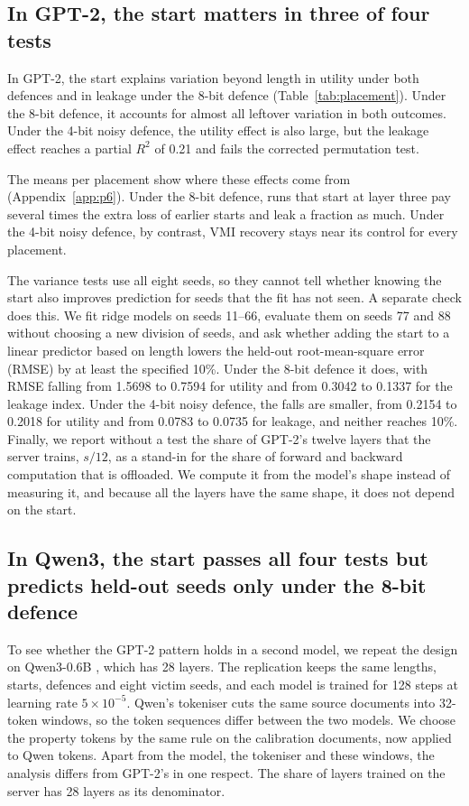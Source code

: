 \documentclass[11pt]{article}
\begin{document}
\subsection{In GPT-2, the start matters in three of four tests}
In GPT-2, the start explains variation beyond length in utility under both defences and in leakage under the 8-bit defence (Table~\ref{tab:placement}). Under the 8-bit defence, it accounts for almost all leftover variation in both outcomes. Under the 4-bit noisy defence, the utility effect is also large, but the leakage effect reaches a partial $R^2$ of 0.21 and fails the corrected permutation test.

The means per placement show where these effects come from (Appendix~\ref{app:p6}). Under the 8-bit defence, runs that start at layer three pay several times the extra loss of earlier starts and leak a fraction as much. Under the 4-bit noisy defence, by contrast, VMI recovery stays near its control for every placement.

The variance tests use all eight seeds, so they cannot tell whether knowing the start also improves prediction for seeds that the fit has not seen. A separate check does this. We fit ridge models on seeds 11--66, evaluate them on seeds 77 and 88 without choosing a new division of seeds, and ask whether adding the start to a linear predictor based on length lowers the held-out root-mean-square error (RMSE) by at least the specified 10\%. Under the 8-bit defence it does, with RMSE falling from 1.5698 to 0.7594 for utility and from 0.3042 to 0.1337 for the leakage index. Under the 4-bit noisy defence, the falls are smaller, from 0.2154 to 0.2018 for utility and from 0.0783 to 0.0735 for leakage, and neither reaches 10\%. Finally, we report without a test the share of GPT-2's twelve layers that the server trains, $s/12$, as a stand-in for the share of forward and backward computation that is offloaded. We compute it from the model's shape instead of measuring it, and because all the layers have the same shape, it does not depend on the start.

\subsection{In Qwen3, the start passes all four tests but predicts held-out seeds only under the 8-bit defence}
\label{sec:qwen}
To see whether the GPT-2 pattern holds in a second model, we repeat the design on Qwen3-0.6B \cite{yang2025qwen3}, which has 28 layers. The replication keeps the same lengths, starts, defences and eight victim seeds, and each model is trained for 128 steps at learning rate $5\times10^{-5}$. Qwen's tokeniser cuts the same source documents into 32-token windows, so the token sequences differ between the two models. We choose the property tokens by the same rule on the calibration documents, now applied to Qwen tokens. Apart from the model, the tokeniser and these windows, the analysis differs from GPT-2's in one respect. The share of layers trained on the server has 28 layers as its denominator.
\end{document}

